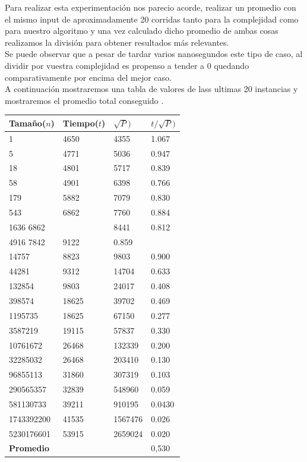 Para realizar esta experimentaci\'on nos parecio acorde, realizar un promedio con el mismo input de aproximadamente 20 corridas
tanto para la complejidad como para nuestro algoritmo y una vez calculado dicho promedio de ambas cosas realizamos la divisi\'on para
obtener resultados m\'as relevantes.\\ 

Se puede observar que a pesar de tardar varios nanosegundos este tipo de caso, al dividir por vuestra complejidad
es propenso a tender a 0 quedando comparativamente por encima del mejor caso.\\

A continuaci\'on mostraremos una tabla de valores de lass ultimas 20 instancias y
mostraremos el promedio total conseguido .\\


\begin{table}[H]

    \begin{tabular}{ | l | l |l |l |}
    \hline
	Tamaño($n$) & Tiempo($t$) & \textbf{$\sqrt{P})$} & \textbf{$t/\sqrt{P})$}  \\ \hline
1 & 4650	 & 4355 &	1.067 \\ \hline
5 &	4771	 & 5036	& 0.947\\ \hline
18 &	4801	 & 5717	& 0.839\\ \hline
58 &	4901	 & 6398	& 0.766\\ \hline
179 &	5882	 & 7079	& 0.830\\ \hline
543	& 6862	&7760 &	0.884\\ \hline
1636	6862 &	&8441 &	0.812\\ \hline
4916	7842	 & 9122 & 	 0.859\\ \hline
14757 &	8823	 & 9803 &	0.900\\ \hline
44281 &	9312	 & 14704 &	0.633\\ \hline
132854 &	 9803	 & 24017 &	0.408\\ \hline
398574 &	 18625 & 	39702 &	0.469\\ \hline
1195735 &	18625 &	67150 &	0.277\\ \hline
3587219	& 19115	& 57837&	 0.330\\ \hline
10761672 	& 26468 &	132339 & 	0.200\\ \hline
32285032	 &26468& 	 203410	& 0.130\\ \hline
96855113 & 	31860 &	307319 & 	0.103\\ \hline
290565357 &	32839 &	548960 &	 0.059\\ \hline
581130733 & 	39211 &	910195 &	 0.0430\\ \hline
1743392200 &	41535 &	1567476 &	0.026\\ \hline
5230176601 &	53915 &	2659024	&0.020\\ \hline

    \textbf{Promedio} & & & 0,530 \\ \hline
    \end{tabular}
\end{table}

